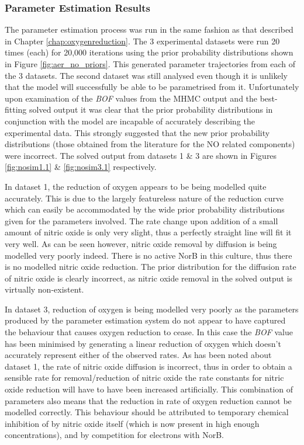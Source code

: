 \subsubsection{Parameter Estimation Results}
The parameter estimation process was run in the same fashion as that described in Chapter \ref{chap:oxygenreduction}. The 3 experimental datasets were run 20 times (each) for 20,000 iterations using the prior probability distributions shown in Figure \ref{fig:aer_no_priors}. This generated parameter trajectories from each of the 3 datasets. The second dataset was still analysed even though it is unlikely that the model will successfully be able to be parametrised from it. Unfortunately upon examination of the \textit{BOF} values from the MHMC output and the best-fitting solved output it was clear that the prior probability distributions in conjunction with the model are incapable of accurately describing the experimental data. This strongly suggested that the new prior probability distributions (those obtained from the literature for the NO related components) were incorrect. The solved output from datasets 1 \& 3 are shown in Figures \ref{fig:nosim1.1} \& \ref{fig:nosim3.1} respectively.

In dataset 1, the reduction of oxygen appears to be being modelled quite accurately. This is due to the largely featureless nature of the reduction curve which can easily be accommodated by the wide prior probability distributions given for the parameters involved. The rate change upon addition of a small amount of nitric oxide is only very slight, thus a perfectly straight line will fit it very well. As can be seen however, nitric oxide removal by diffusion is being modelled very poorly indeed. There is no active NorB in this culture, thus there is no modelled nitric oxide reduction. The prior distribution for the diffusion rate of nitric oxide is clearly incorrect, as nitric oxide removal in the solved output is virtually non-existent.

In dataset 3, reduction of oxygen is being modelled very poorly as the parameters produced by the parameter estimation system do not appear to have captured the behaviour that causes oxygen reduction to cease. In this case the \textit{BOF} value has been minimised by generating a linear reduction of oxygen which doesn't accurately represent either of the observed rates. As has been noted about dataset 1, the rate of nitric oxide diffusion is incorrect, thus in order to obtain a sensible rate for removal/reduction of nitric oxide the rate constants for nitric oxide reduction will have to have been increased artificially. This combination of parameters also means that the reduction in rate of oxygen reduction cannot be modelled correctly. This behaviour should be attributed to temporary chemical inhibition of \cbbthree{} by nitric oxide itself (which is now present in high enough concentrations), and by competition for electrons with NorB.

